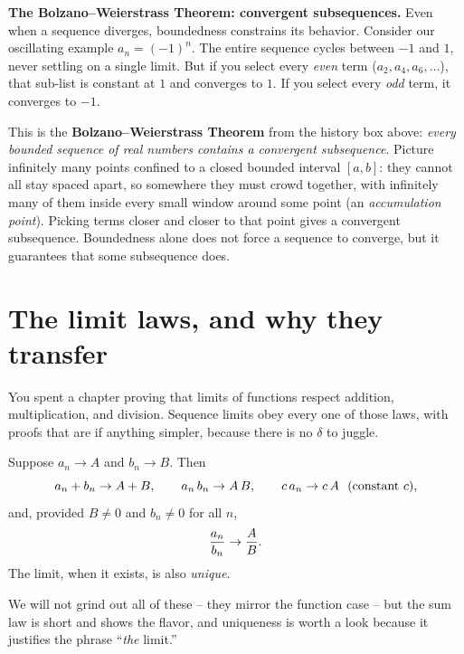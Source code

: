 \begin{connectionbox}
\textbf{The Bolzano--Weierstrass Theorem: convergent subsequences.}
Even when a sequence diverges, boundedness constrains its behavior. Consider our oscillating example $a_n = (-1)^n$. The entire sequence cycles between $-1$ and $1$, never settling on a single limit. But if you select every \emph{even} term ($a_2, a_4, a_6, \dots$), that sub-list is constant at $1$ and converges to $1$. If you select every \emph{odd} term, it converges to $-1$.

This is the \textbf{Bolzano--Weierstrass Theorem} from the history box above: \emph{every bounded sequence of real numbers contains a convergent subsequence}. Picture infinitely many points confined to a closed bounded interval $[a, b]$: they cannot all stay spaced apart, so somewhere they must crowd together, with infinitely many of them inside every small window around some point (an \emph{accumulation point}). Picking terms closer and closer to that point gives a convergent subsequence. Boundedness alone does not force a sequence to converge, but it guarantees that some subsequence does.
\end{connectionbox}

\section{The limit laws, and why they transfer}
\label{ch28:limit-laws}

You spent a chapter proving that limits of functions respect addition,
multiplication, and division. Sequence limits obey every one
of those laws, with proofs that are if anything simpler, because there is no
$\delta$ to juggle.

\begin{theorem}
\label{ch28:thm-laws}
Suppose $a_n \to A$ and $b_n \to B$. Then
\[
  a_n + b_n \to A + B, \qquad
  a_n\,b_n \to A\,B, \qquad
  c\,a_n \to c\,A \ \ (\text{constant } c),
\]
and, provided $B \ne 0$ and $b_n \ne 0$ for all $n$,
\[
  \frac{a_n}{b_n} \to \frac{A}{B}.
\]
The limit, when it exists, is also \emph{unique}.
\end{theorem}

We will not grind out all of these -- they mirror the function case -- but the
sum law is short and shows the flavor, and uniqueness is worth a look because
it justifies the phrase ``\emph{the} limit.''

